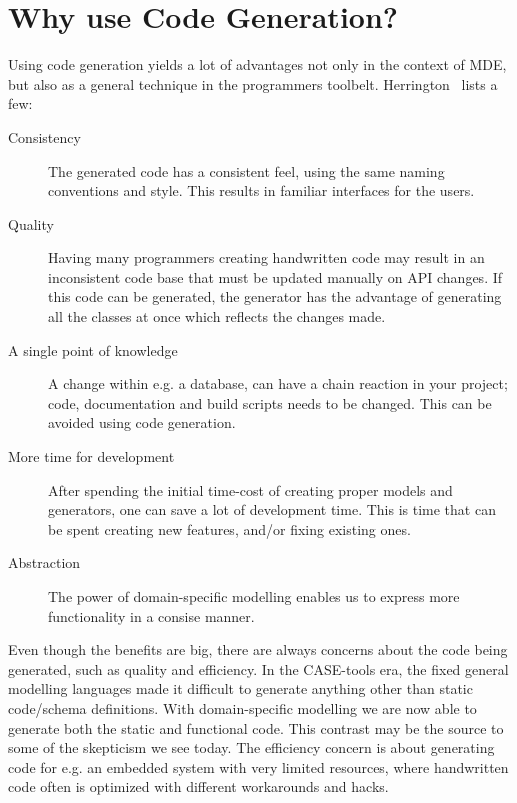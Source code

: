 \section{Why use Code Generation?}
Using code generation yields a lot of advantages not only in the context of MDE, but also as a general technique in the programmers toolbelt. Herrington~\cite{herrington:codegeneration} lists a few: 
\begin{description}

\item[Consistency]
The generated code has a consistent feel, using the same naming conventions and style. This results in familiar interfaces for the users.

\item[Quality]
Having many programmers creating handwritten code may result in an inconsistent code base that must be updated manually on API changes. If this code can be generated, the generator has the advantage of generating all the classes at once which reflects the changes made.

\item[A single point of knowledge]
A change within e.g. a database, can have a chain reaction in your project; code, documentation and build scripts needs to be changed. This can be avoided using code generation.

\item[More time for development]
After spending the initial time-cost of creating proper models and generators, one can save a lot of development time. This is time that can be spent creating new features, and/or fixing existing ones.

\item[Abstraction]
The power of domain-specific modelling enables us to express more functionality in a consise manner.

\end{description}

Even though the benefits are big, there are always concerns about the code being generated, such as quality and efficiency. In the CASE-tools era, the fixed general modelling languages made it difficult to generate anything other than static code/schema definitions. With domain-specific modelling we are now able to generate both the static and functional code. This contrast may be the source to some of the skepticism we see today. The efficiency concern is about generating code for e.g. an embedded system with very limited resources, where handwritten code often is optimized with different workarounds and hacks. 

